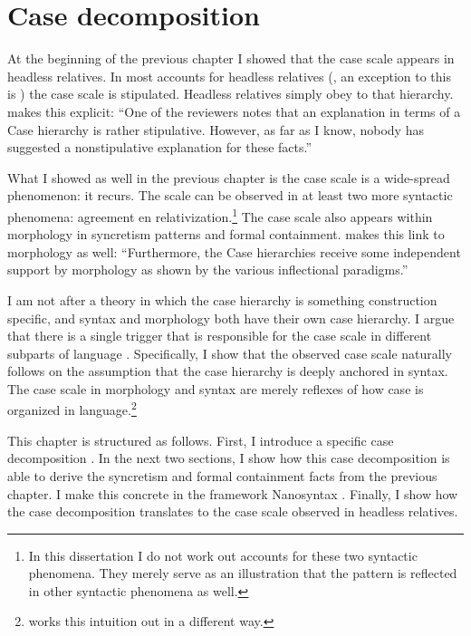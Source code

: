 
\chapter{Case decomposition}

At the beginning of the previous chapter I showed that the case scale  appears in headless relatives. In most accounts for headless relatives (\citealt[cf.][]{pittner1995,vogel2001,grosu2003,harbert1978}, an exception to this is \citealt{himmelreich2017}) the case scale is stipulated. Headless relatives simply obey to that hierarchy.  makes this explicit: ``One of the reviewers notes that an explanation in terms of a Case hierarchy is rather stipulative. However, as far as I know, nobody has suggested a nonstipulative explanation for these facts.''

What I showed as well in the previous chapter is the case scale  is a wide-spread phenomenon: it recurs. The scale can be observed in at least two more syntactic phenomena: agreement en relativization.\footnote{
In this dissertation I do not work out accounts for these two syntactic phenomena. They merely serve as an illustration that the pattern is reflected in other syntactic phenomena as well.}
The case scale also appears within morphology in syncretism patterns and formal containment.  makes this link to morphology as well: ``Furthermore, the Case hierarchies receive some independent support by morphology as shown by the various inflectional paradigms.''

I am not after a theory in which the case hierarchy is something construction specific, and syntax and morphology both have their own case hierarchy. I argue that there is a single trigger that is responsible for the case scale in different subparts of language \citep[cf.][on numeral constructions]{caha2019}. Specifically, I show that the observed case scale naturally follows on the assumption that the case hierarchy is deeply anchored in syntax. The case scale in morphology and syntax are merely reflexes of how case is organized in language.\footnote{
\citet{himmelreich2017} works this intuition out in a different way.
}

This chapter is structured as follows. First, I introduce a specific case decomposition \citep{caha2009}. In the next two sections, I show how this case decomposition is able to derive the syncretism and formal containment facts from the previous chapter. I make this concrete in the framework Nanosyntax \citep{starke2009}. Finally, I show how the case decomposition translates to the case scale observed in headless relatives.


